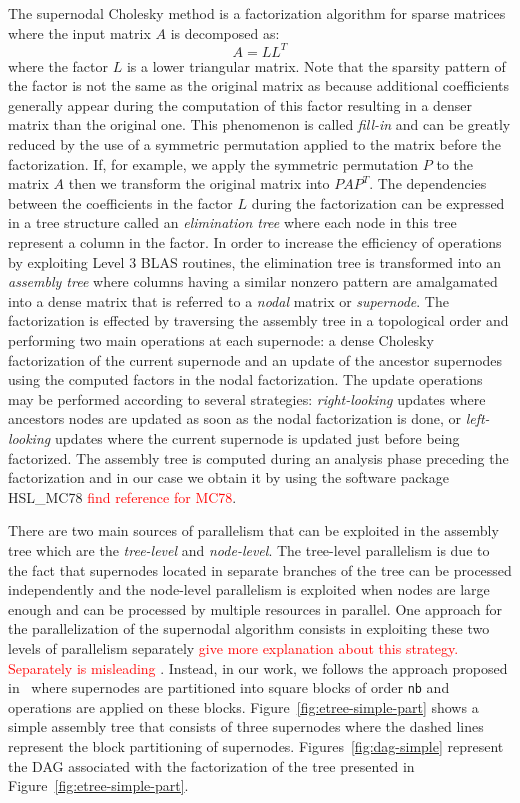 \documentclass{article}
\newcommand{\alert}[1]{\textcolor{red}{#1}\xspace}
\begin{document}
The supernodal Cholesky method is a factorization algorithm for sparse
matrices where the input matrix $A$ is decomposed as:
\begin{equation}\label{eq:chol}
  A = LL^{T}
\end{equation}
where the factor $L$ is a lower triangular matrix. Note that the
sparsity pattern of the factor is not the same as the original matrix
as because additional coefficients generally appear during the
computation of this factor resulting in a denser matrix than the
original one. This phenomenon is called \textit{fill-in} and can be
greatly reduced by the use of a symmetric permutation applied to the
matrix before the factorization. If, for example, we apply the
symmetric permutation $P$ to the matrix $A$ then we transform the
original matrix into $PAP^{T}$. The dependencies between the
coefficients in the factor $L$ during the factorization can be
expressed in a tree structure called an \textit{elimination tree}
where each node in this tree represent a column in the factor. In
order to increase the efficiency of operations by exploiting Level 3
BLAS routines, the elimination tree is transformed into an
\textit{assembly tree} where columns having a similar nonzero pattern
are amalgamated into a dense matrix that is referred to a
\textit{nodal} matrix or \textit{supernode}. The factorization is
effected by traversing the assembly tree in a topological order and
performing two main operations at each supernode: a dense Cholesky
factorization of the current supernode and an update of the ancestor
supernodes using the computed factors in the nodal factorization. The
update operations may be performed according to several strategies:
\textit{right-looking} updates where ancestors nodes are updated as
soon as the nodal factorization is done, or \textit{left-looking}
updates where the current supernode is updated just before being
factorized. The assembly tree is computed during an analysis phase
preceding the factorization and in our case we obtain it by using the
software package HSL\_MC78 \alert{find reference for MC78}.

There are two main sources of parallelism that can be exploited in the
assembly tree which are the \textit{tree-level} and
\textit{node-level}. The tree-level parallelism is due to the fact
that supernodes located in separate branches of the tree can be
processed independently and the node-level parallelism is exploited
when nodes are large enough and can be processed by multiple resources
in parallel. One approach for the parallelization of the supernodal
algorithm consists in exploiting these two levels of parallelism
separately \alert{give more explanation about this
  strategy. Separately is misleading} . Instead, in our work, we
follows the approach proposed in~\cite{h.r.s:10} where supernodes are
partitioned into square blocks of order \texttt{nb} and operations are
applied on these blocks. Figure~\ref{fig:etree-simple-part} shows a
simple assembly tree that consists of three supernodes where the
dashed lines represent the block partitioning of
supernodes. Figures~\ref{fig:dag-simple} represent the DAG associated
with the factorization of the tree presented in
Figure~\ref{fig:etree-simple-part}.
\end{document}
